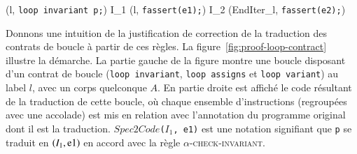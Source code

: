 {\scriptsize
  {
    {
      (l, \mbox{\lstinline'loop invariant p;'}) 
      I_1 \concat (l, \mbox{\lstinline'fassert(e1);'})
      \concat I_2 \concat (EndIter_l, \mbox{\lstinline'fassert(e2);'})
    }
  }
}

{\scriptsize
  {
    {
    }
  }
}


Donnons une intuition de la justification de correction de la traduction des
contrats de boucle à partir de ces règles.
La figure~\ref{fig:proof-loop-contract} illustre la démarche.
La partie gauche de la figure montre une boucle disposant d'un contrat de boucle
(\lstinline'loop invariant', \lstinline'loop assigns' et
\lstinline'loop variant') au label $l$, avec un corps quelconque $A$.
En partie droite est affiché le code résultant de la traduction de cette
boucle, où chaque ensemble d'instructions (regroupées avec une accolade) est
mis en relation avec l'annotation du programme original dont il est la
traduction.
$Spec2Code$\lstinline'('$I_1$\lstinline', e1)' est une notation signifiant que
\lstinline'p' se traduit en $(I_1, \mbox{\lstinline'e1'})$ en accord avec la
règle \textsc{$\alpha$-check-invariant}.

